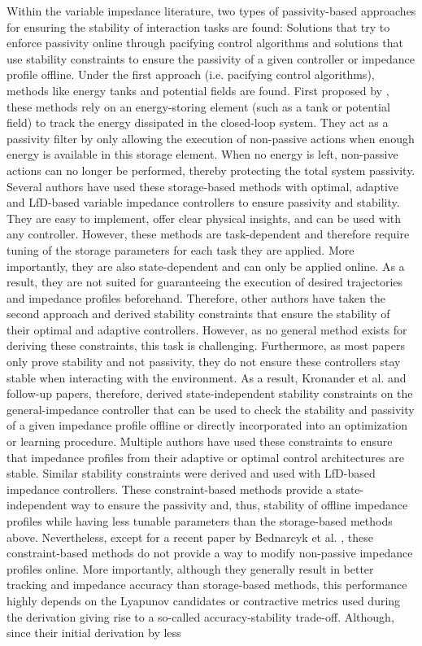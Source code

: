 Within the variable impedance literature, two types of passivity-based approaches for ensuring the stability of interaction tasks are found: Solutions that try to enforce passivity online through pacifying control algorithms and solutions that use stability constraints to ensure the passivity of a given controller or impedance profile offline. Under the first approach (i.e. pacifying control algorithms), methods like energy tanks and potential fields are found. First proposed by \cite{ferragutiTankbasedApproachImpedance2013}, these methods rely on an energy-storing element (such as a tank or potential field) to track the energy dissipated in the closed-loop system. They act as a passivity filter by only allowing the execution of non-passive actions when enough energy is available in this storage element. When no energy is left, non-passive actions can no longer be performed, thereby protecting the total system passivity. Several authors have used these storage-based methods with optimal, adaptive and LfD-based variable impedance controllers to ensure passivity and stability. They are easy to implement, offer clear physical insights, and can be used with any controller. However, these methods are task-dependent and therefore require tuning of the storage parameters for each task they are applied. More importantly, they are also state-dependent and can only be applied online. As a result, they are not suited for guaranteeing the execution of desired trajectories and impedance profiles beforehand. Therefore, other authors have taken the second approach and derived stability constraints that ensure the stability of their optimal and adaptive controllers. However, as no general method exists for deriving these constraints, this task is challenging. Furthermore, as most papers only prove stability and not passivity, they do not ensure these controllers stay stable when interacting with the environment. As a result, Kronander et al. \cite{kronanderStabilityConsiderationsVariable2016} and follow-up papers, therefore, derived state-independent stability constraints on the general-impedance controller that can be used to check the stability and passivity of a given impedance profile offline or directly incorporated into an optimization or learning procedure. Multiple authors have used these constraints to ensure that impedance profiles from their adaptive or optimal control architectures are stable. Similar stability constraints were derived and used with LfD-based impedance controllers. These constraint-based methods provide a state-independent way to ensure the passivity and, thus, stability of offline impedance profiles while having less tunable parameters than the storage-based methods above. Nevertheless, except for a recent paper by Bednarcyk et al. \cite {bednarczykPassivityFilterVariable2020}, these constraint-based methods do not provide a way to modify non-passive impedance profiles online. More importantly, although they generally result in better tracking and impedance accuracy than storage-based methods, this performance highly depends on the Lyapunov candidates or contractive metrics used during the derivation giving rise to a so-called accuracy-stability trade-off. Although, since their initial derivation by \cite{kronanderStabilityConsiderationsVariable2016} less 